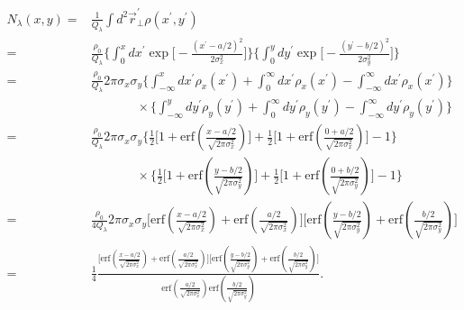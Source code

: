 \documentclass[11pt,oneside]{article}
\begin{document}
\begin{equation}
\begin{split}
  N_{\lambda} (x,y)
= & \frac{1}{Q_{\lambda}}
    \int d^{2} \vec{r}_{\perp}^{\prime}
    \rho \left( x^{\prime}, y^{\prime} \right) \\
= & \frac{\rho_{0}}{Q_{\lambda}} 
    \Bigg\{
      \int_{0}^{x} dx^{\prime}
      \exp \bigg[
         - \frac{ \left( x^{\prime} - a/2 \right)^{2} }{ 2\sigma_{x}^{2}}
           \bigg]
    \Bigg\}
    \Bigg\{
      \int_{0}^{y} dy^{\prime}
      \exp \bigg[
         - \frac{ \left( y^{\prime} - b/2 \right)^{2} }{ 2\sigma_{y}^{2}}
           \bigg]
    \Bigg\} \\
= & \frac{\rho_{0}}{Q_{\lambda}} 2 \pi \sigma_{x} \sigma_{y}
    \Bigg\{
      \int_{-\infty}^{x} dx^{\prime} \rho_{x} (x^{\prime})
    + \int_{0}^{\infty} dx^{\prime} \rho_{x} (x^{\prime})
    - \int_{-\infty}^{\infty} dx^{\prime} \rho_{x} (x^{\prime})
    \Bigg\} \\
  & \;\;\;\;\;\;\;\;\;\;\;\;\;
    \times
    \Bigg\{
      \int_{-\infty}^{y} dy^{\prime} \rho_{y} (y^{\prime})
    + \int_{0}^{\infty} dy^{\prime} \rho_{y} (y^{\prime})
    - \int_{-\infty}^{\infty} dy^{\prime} \rho_{y} (y^{\prime})
    \Bigg\} \\
= & \frac{\rho_{0}}{Q_{\lambda}} 2 \pi \sigma_{x} \sigma_{y}
    \Bigg\{
      \frac{1}{2}
      \bigg[
        1 + \mbox{erf} \left( \frac{x-a/2}{\sqrt{2 \pi \sigma_{x}^{2}}} \right)
      \bigg]
    + \frac{1}{2}
      \bigg[
        1 + \mbox{erf} \left( \frac{0+a/2}{\sqrt{2 \pi \sigma_{x}^{2}}} \right)
      \bigg]
    - 1
    \Bigg\} \\
  & \;\;\;\;\;\;\;\;\;\;\;\;\;
    \times
    \Bigg\{
      \frac{1}{2}
      \bigg[
        1 + \mbox{erf} \left( \frac{y-b/2}{\sqrt{2 \pi \sigma_{y}^{2}}} \right)
      \bigg]
    + \frac{1}{2}
      \bigg[
        1 + \mbox{erf} \left( \frac{0+b/2}{\sqrt{2 \pi \sigma_{y}^{2}}} \right)
      \bigg]
    - 1
    \Bigg\} \\
= & \frac{\rho_{0}}{4 Q_{\lambda}} 2 \pi \sigma_{x} \sigma_{y}
    \Bigg[
      \mbox{erf} \left( \frac{x-a/2}{\sqrt{2 \pi \sigma_{x}^{2}}} \right)
    + \mbox{erf} \left( \frac{a/2}{\sqrt{2 \pi \sigma_{x}^{2}}} \right)
    \Bigg]
    \Bigg[
      \mbox{erf} \left( \frac{y-b/2}{\sqrt{2 \pi \sigma_{y}^{2}}} \right)
    + \mbox{erf} \left( \frac{b/2}{\sqrt{2 \pi \sigma_{y}^{2}}} \right)
    \Bigg] \\
= & \frac{1}{4}
    \frac{
    \Bigg[
      \mbox{erf} \left( \frac{x-a/2}{\sqrt{2 \pi \sigma_{x}^{2}}} \right)
    + \mbox{erf} \left( \frac{a/2}{\sqrt{2 \pi \sigma_{x}^{2}}} \right)
    \Bigg]
    \Bigg[
      \mbox{erf} \left( \frac{y-b/2}{\sqrt{2 \pi \sigma_{y}^{2}}} \right)
    + \mbox{erf} \left( \frac{b/2}{\sqrt{2 \pi \sigma_{y}^{2}}} \right)
    \Bigg]
         }
         {
      \mbox{erf} \left( \frac{a/2}{\sqrt{2 \pi \sigma_{x}^{2}}} \right)
      \mbox{erf} \left( \frac{b/2}{\sqrt{2 \pi \sigma_{y}^{2}}} \right)
         } .
\end{split}
\end{equation}
\end{document}
